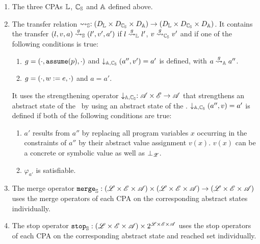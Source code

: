 \begin{enumerate}[leftmargin=*, label=\arabic*.]
\item The three CPAs $\mathbb{L}$, $\mathbb{C_{S}}$ and $\mathbb{A}$ defined above.
\item The transfer relation $\rightsquigarrow_{\mathbb{S}} : (D_{\mathbb{L}} \times D_{\mathbb{C_{S}}} \times D_{\mathbb{A}}) \rightarrow (D_{\mathbb{L}} \times D_{\mathbb{C_{S}}} \times D_{\mathbb{A}})$.
	It contains the transfer $(l, v, a) \overset{g}{\rightsquigarrow}_{\mathbb{S}} (l', v', a')$ if $l \overset{g}{\rightsquigarrow}_{\mathbb{L}} l'$, $v \overset{g}{\rightsquigarrow}_{\mathbb{C_{S}}} v'$ and if one of the following conditions is true:
	\begin{enumerate}[label=\alph*)]
		\item $g = (\cdot, \texttt{assume}(p), \cdot)$ and $\downarrow_{{\mathbb{A}}, {\mathbb{C_{S}}}}(a'', v') = a'$ is defined, with $a \overset{g}{\rightsquigarrow}_{\mathbb{A}} a''$.

		\item $g = (\cdot, w := e, \cdot)$ and $a = a'$.
	\end{enumerate}
	It uses the strengthening operator $\downarrow_{{\mathbb{A}}, {\mathbb{C_{S}}}} : \mathscr{A} \times \mathscr{E} \rightarrow \mathscr{A}$ that strengthens an abstract state of the \constraintsCPA\ by using an abstract state of the \symbolicValueAnalysisCPA.
	$\downarrow_{{\mathbb{A}}, {\mathbb{C_{S}}}}(a'', v) = a'$ is defined if both of the following conditions are true:
	\begin{enumerate}[label=\alph*)]
		\item $a'$ results from $a''$ by replacing all program variables $x$ occurring in the constraints of $a''$ by their abstract value assignment $v(x)$.
			$v(x)$ can be a concrete or symbolic value as well as $\bot_{\mathscr{Z}}$.
		\item  $\varphi_{a'}$ is satisfiable.
	\end{enumerate}
\item The merge operator
	$\texttt{merge}_{\mathbb{S}} : (\mathscr{L} \times \mathscr{E} \times \mathscr{A}) \times (\mathscr{L} \times \mathscr{E} \times \mathscr{A}) \rightarrow (\mathscr{L} \times \mathscr{E} \times \mathscr{A})$ uses the merge operators of each CPA on the corresponding abstract states individually.
\item The stop operator $\texttt{stop}_{\mathbb{S}} : (\mathscr{L} \times \mathscr{E} \times \mathscr{A}) \times 2^{\mathscr{L} \times \mathscr{E} \times \mathscr{A}}$
	uses the stop operators of each CPA on the corresponding abstract state and reached set individually.
\end{enumerate}